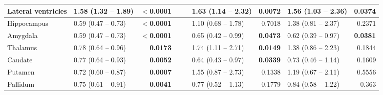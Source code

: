 \begin{sidewaystable}
{\begin{tabular}{|l|lr|lr|lr|lr|}
\hline
Lateral ventricles & \textcolor[rgb]{0.2,0.2,0.2}{1.58 (1.32 -- 1.89)} & \textbf{$<$0.0001} & {\cellcolor[rgb]{0.753,0.753,0.753}} & {\cellcolor[rgb]{0.753,0.753,0.753}} & \textcolor[rgb]{0.2,0.2,0.2}{1.63 (1.14 -- 2.32)} & \textcolor[rgb]{0.2,0.2,0.2}{\textbf{0.0072}} & \textcolor[rgb]{0.2,0.2,0.2}{1.56 (1.03 -- 2.36)} & \textcolor[rgb]{0.2,0.2,0.2}{\textbf{0.0374}} \\ 
\hline
Hippocampus & \textcolor[rgb]{0.2,0.2,0.2}{0.59 (0.47 -- 0.73)} & \textbf{$<$0.0001} & {\cellcolor[rgb]{0.753,0.753,0.753}} & {\cellcolor[rgb]{0.753,0.753,0.753}} & \textcolor[rgb]{0.2,0.2,0.2}{1.10 (0.68 -- 1.78)} & \textcolor[rgb]{0.2,0.2,0.2}{0.7018} & \textcolor[rgb]{0.2,0.2,0.2}{1.38 (0.81 -- 2.37)} & \textcolor[rgb]{0.2,0.2,0.2}{0.2371} \\ 
\hline
Amygdala & \textcolor[rgb]{0.2,0.2,0.2}{0.59 (0.47 -- 0.73)} & \textbf{$<$0.0001} & {\cellcolor[rgb]{0.753,0.753,0.753}} & {\cellcolor[rgb]{0.753,0.753,0.753}} & \textcolor[rgb]{0.2,0.2,0.2}{0.65 (0.42 -- 0.99)} & \textcolor[rgb]{0.2,0.2,0.2}{\textbf{0.0473}} & \textcolor[rgb]{0.2,0.2,0.2}{0.62 (0.39 -- 0.97)} & \textcolor[rgb]{0.2,0.2,0.2}{\textbf{0.0381}} \\ 
\hline
Thalamus & \textcolor[rgb]{0.2,0.2,0.2}{0.78 (0.64 -- 0.96)} & \textcolor[rgb]{0.2,0.2,0.2}{\textbf{0.0173}} & {\cellcolor[rgb]{0.753,0.753,0.753}} & {\cellcolor[rgb]{0.753,0.753,0.753}} & \textcolor[rgb]{0.2,0.2,0.2}{1.74 (1.11 -- 2.71)} & \textcolor[rgb]{0.2,0.2,0.2}{\textbf{0.0149}} & \textcolor[rgb]{0.2,0.2,0.2}{1.38 (0.86 -- 2.23)} & \textcolor[rgb]{0.2,0.2,0.2}{0.1844} \\ 
\hline
Caudate & \textcolor[rgb]{0.2,0.2,0.2}{0.77 (0.64 -- 0.93)} & \textcolor[rgb]{0.2,0.2,0.2}{\textbf{0.0052}} & {\cellcolor[rgb]{0.753,0.753,0.753}} & {\cellcolor[rgb]{0.753,0.753,0.753}} & \textcolor[rgb]{0.2,0.2,0.2}{0.64 (0.43 -- 0.97)} & \textcolor[rgb]{0.2,0.2,0.2}{\textbf{0.0339}} & \textcolor[rgb]{0.2,0.2,0.2}{0.73 (0.46 -- 1.14)} & \textcolor[rgb]{0.2,0.2,0.2}{0.1609} \\ 
\hline
Putamen & \textcolor[rgb]{0.2,0.2,0.2}{0.72 (0.60 -- 0.87)} & \textcolor[rgb]{0.2,0.2,0.2}{\textbf{0.0007}} & {\cellcolor[rgb]{0.753,0.753,0.753}} & {\cellcolor[rgb]{0.753,0.753,0.753}} & \textcolor[rgb]{0.2,0.2,0.2}{1.55 (0.87 -- 2.73)} & \textcolor[rgb]{0.2,0.2,0.2}{0.1338} & \textcolor[rgb]{0.2,0.2,0.2}{1.19 (0.67 -- 2.11)} & \textcolor[rgb]{0.2,0.2,0.2}{0.5556} \\ 
\hline
Pallidum & \textcolor[rgb]{0.2,0.2,0.2}{0.75 (0.61 -- 0.91)} & \textcolor[rgb]{0.2,0.2,0.2}{\textbf{0.0041}} & {\cellcolor[rgb]{0.753,0.753,0.753}} & {\cellcolor[rgb]{0.753,0.753,0.753}} & \textcolor[rgb]{0.2,0.2,0.2}{0.77 (0.52 -- 1.13)} & \textcolor[rgb]{0.2,0.2,0.2}{0.1779} & \textcolor[rgb]{0.2,0.2,0.2}{0.84 (0.58 -- 1.22)} & \textcolor[rgb]{0.2,0.2,0.2}{0.363} \\ 

\end{tabular}}
\end{sidewaystable}
